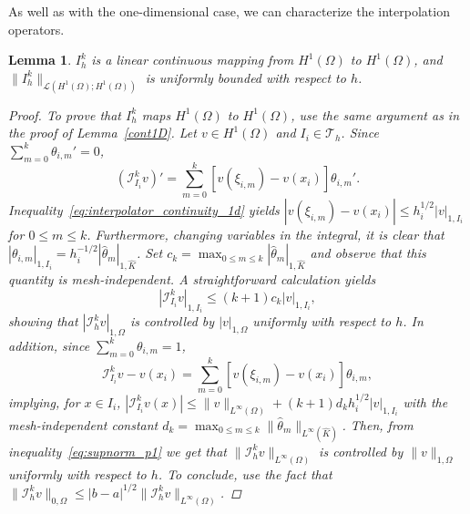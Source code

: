 \documentclass{article}
\newtheorem{lemma}{Lemma}
\begin{document}
As well as with the one-dimensional case, we can characterize the interpolation operators.
\begin{lemma}
    $I_h^k$ is a linear continuous mapping from $H^1(\Omega)$ to $H^1(\Omega)$, and $\|I_h^k\|_{\mathcal{L}(H^1(\Omega);H^1(\Omega))}$ is uniformly bounded with respect to $h$.
\begin{proof}
    To prove that $I_h^k$ maps $H^1(\Omega)$ to $H^1(\Omega)$, use the same argument as in the proof of Lemma~\ref{cont1D}.
    Let $v \in H^1(\Omega)$ and $I_i \in \mathcal{T}_h$. Since $\sum_{m=0}^k \theta_{i,m}' = 0$,
    $$ (\mathcal{I}_{I_i}^k v)' = \sum_{m=0}^k [v(\xi_{i,m}) - v(x_i)] \theta_{i,m}'. $$
    Inequality~\ref{eq:interpolator_continuity_1d} yields $|v(\xi_{i,m}) - v(x_i)| \le h_i^{1/2} |v|_{1,I_i}$ for $0 \le m \le k$. Furthermore, changing variables in the integral, it is clear that $|\theta_{i,m}|_{1,I_i} = h_i^{-1/2} |\hat{\theta}_m|_{1,\hat{K}}$. Set $c_k = \max_{0 \le m \le k} |\hat{\theta}_m|_{1,\hat{K}}$ and observe that this quantity is mesh-independent. A straightforward calculation yields
    $$ |\mathcal{I}_{I_i}^k v|_{1,I_i} \le (k+1) c_k |v|_{1,I_i}, $$
    showing that $|\mathcal{I}_h^k v|_{1,\Omega}$ is controlled by $|v|_{1,\Omega}$ uniformly with respect to $h$. In addition, since $\sum_{m=0}^k \theta_{i,m} = 1$,
    $$ \mathcal{I}_{I_i}^k v - v(x_i) = \sum_{m=0}^k [v(\xi_{i,m}) - v(x_i)] \theta_{i,m}, $$
    implying, for $x \in I_i$, $|\mathcal{I}_{I_i}^k v(x)| \le \|v\|_{L^\infty(\Omega)} + (k+1) d_k h_i^{1/2} |v|_{1,I_i}$ with the mesh-independent constant $d_k = \max_{0 \le m \le k} \|\hat{\theta}_m\|_{L^\infty(\hat{K})}$. Then, from inequality~\ref{eq:supnorm_p1} we get that $\|\mathcal{I}_h^k v\|_{L^\infty(\Omega)}$ is controlled by $\|v\|_{1,\Omega}$ uniformly with respect to $h$. To conclude, use the fact that $\|\mathcal{I}_h^k v\|_{0,\Omega} \le |b-a|^{1/2} \|\mathcal{I}_h^k v\|_{L^\infty(\Omega)}$.
\end{proof}
\end{lemma}
\end{document}
